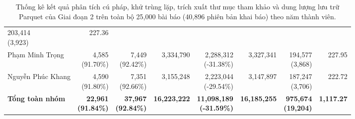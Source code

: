 \begin{table}[H]
\begin{tabularx}{\textwidth}{@{}X r r r r r r r@{}}
            \shortstack[r]{203,414 \\ {\scriptsize (3,923)}} &
            227.36 \\
        \addlinespace[3pt]
        Phạm Minh Trọng &
            \shortstack[r]{4,585 \\ {\scriptsize (91.70\%)}} &
            \shortstack[r]{7,449 \\ {\scriptsize (92.42\%)}} &
            3,334,790 &
            \shortstack[r]{2,288,312 \\ {\scriptsize (-31.38\%)}} &
            3,327,341 &
            \shortstack[r]{194,577 \\ {\scriptsize (3,868)}} &
            227.95 \\
        \addlinespace[3pt]
        Nguyễn Phúc Khang &
            \shortstack[r]{4,590 \\ {\scriptsize (91.80\%)}} &
            \shortstack[r]{7,351 \\ {\scriptsize (92.66\%)}} &
            3,155,248 &
            \shortstack[r]{2,223,044 \\ {\scriptsize (-29.54\%)}} &
            3,147,897 &
            \shortstack[r]{187,247 \\ {\scriptsize (3,706)}} &
            222.72 \\
        \midrule
        \textbf{Tổng toàn nhóm} &
            \shortstack[r]{\textbf{22,961} \\ {\scriptsize \textbf{(91.84\%)}}} &
            \shortstack[r]{\textbf{37,967} \\ {\scriptsize \textbf{(92.84\%)}}} &
            \textbf{16,223,222} &
            \shortstack[r]{\textbf{11,098,189} \\ {\scriptsize \textbf{(-31.59\%)}}} &
            \textbf{16,185,255} &
            \shortstack[r]{\textbf{975,674} \\ {\scriptsize \textbf{(19,204)}}} &
            \textbf{1,117.27} \\
        \bottomrule
    \end{tabularx}
    \caption{Thống kê kết quả phân tích cú pháp, khử trùng lặp, trích xuất thư mục tham khảo và dung lượng lưu trữ Parquet của Giai đoạn 2 trên toàn bộ 25,000 bài báo (40,896 phiên bản khai báo) theo năm thành viên.}
    \label{tab:m2_owner_stats}
\end{table}

